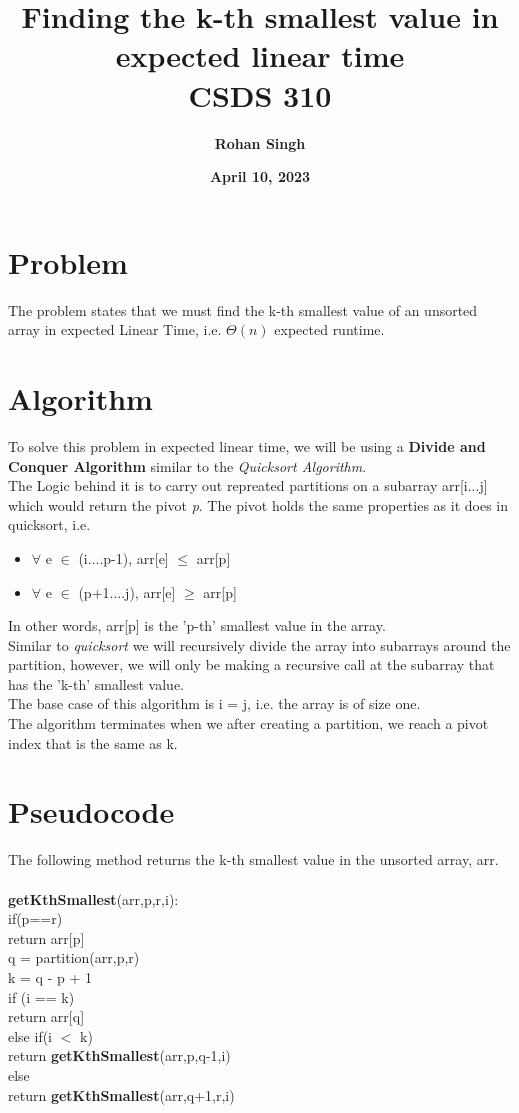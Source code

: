 \documentclass[12pt, letterpaper]{article}
\title{\textbf{Finding the k-th smallest value in expected linear time\\CSDS 310}}
\author{\textbf{Rohan Singh}}
\date{\textbf{April 10, 2023}}
\begin{document}
\maketitle

\section{Problem}
The problem states that we must find the k-th smallest value of an unsorted array in expected Linear Time, i.e. $\Theta(n)$ expected runtime.

\section{Algorithm}

To solve this problem in expected linear time, we will be using a \textbf{Divide and Conquer Algorithm} similar to the \textit{Quicksort Algorithm}. \\

The Logic behind it is to carry out repreated partitions on a subarray arr[i...j] which would return the pivot \textit{p}. The pivot holds the same properties as it does in quicksort, i.e. 
\begin{itemize}
	\item $\forall$ e $\in$ (i....p-1), arr[e] $\leq$ arr[p]
	\item $\forall$ e $\in$ (p+1....j), arr[e] $\geq$ arr[p]
\end{itemize}

In other words, arr[p] is the 'p-th' smallest value in the array.\\

Similar to \textit{quicksort} we will recursively divide the array into subarrays around the partition, however, we will only be making a recursive call at the subarray that has the 'k-th' smallest value.\\

The base case of this algorithm is  i = j, i.e. the array is of size one.\\

The algorithm terminates when we after creating a partition, we reach a pivot index that is the same as k.


\section{Pseudocode}
The following method returns the k-th smallest value in the unsorted array, arr.\\\\
\textbf{getKthSmallest}(arr,p,r,i):\\
if(p==r)\\
return arr[p]\\
q  = partition(arr,p,r)\\
k = q - p + 1\\
if (i == k) \\
return arr[q] \\
else if(i $<$ k)\\
return \textbf{getKthSmallest}(arr,p,q-1,i) \\
else\\
return \textbf{getKthSmallest}(arr,q+1,r,i)
\end{document}
